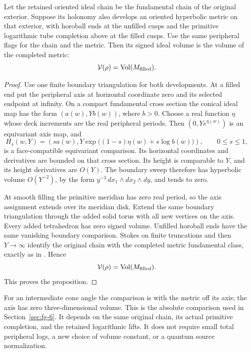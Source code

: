 \begin{proposition}
\label{prop:app-same-chain-volume}
Let the retained oriented ideal chain be the fundamental chain of the
original exterior. Suppose its holonomy also develops an oriented
hyperbolic metric on that exterior, with horoball ends at the unfilled
cusps and the primitive logarithmic tube completion above at the filled
cusps. Use the same peripheral flags for the chain and the metric.
Then its signed ideal volume is the volume of the completed metric:
\[
                  \mathcal V(\rho)=\operatorname{Vol}(M_{\mathrm{filled}}).
\]
\end{proposition}

\begin{proof}
Use one finite boundary triangulation for both developments.
At a filled end put the peripheral axis at horizontal coordinate zero
and its selected endpoint at infinity. On a compact fundamental cross
section the conical ideal map has the form
\((a(w),Yb(w))\), where \(b>0\). Choose a real function \(\eta\)
whose deck increments are the real peripheral periods. Then
\((0,Ye^{\eta(w)})\) is an equivariant axis map, and
\[
 H_s(w,Y)=\left(sa(w),
     Y\exp\bigl((1-s)\eta(w)+s\log b(w)\bigr)\right),
                  \qquad 0\le s\le1,
\]
is a face-compatible equivariant comparison. Its horizontal coordinates
and derivatives are bounded on that cross section. Its height is
comparable to \(Y\), and its height derivatives are \(O(Y)\).
The boundary sweep therefore has hyperbolic volume \(O(Y^{-2})\),
by the form \(y^{-3}\,dx_1\wedge dx_2\wedge dy\), and tends to zero.

At smooth filling the primitive meridian has zero real period, so the
axis assignment extends over its meridian disk. Extend the same boundary
triangulation through the added solid torus with all new vertices on the
axis. Every added tetrahedron has zero signed volume. Unfilled horoball
ends have the same vanishing boundary comparison. Stokes on finite
truncations and then \(Y\to\infty\) identify the original chain with
the completed metric fundamental class, exactly as in
\cite[Section~7.3]{MarkedFillings}. Hence
\[
                  \mathcal V(\rho)=\operatorname{Vol}(M_{\mathrm{filled}}).
\]
This proves the proposition.
\end{proof}

For an intermediate cone angle the comparison is with the metric off
its axis; the axis has zero three-dimensional volume. This is the
absolute comparison used in Section~\ref{sec:fg-6}. It depends on the
same original chain, its actual primitive completion, and the retained
logarithmic lifts. It does not require small total peripheral logs, a
new choice of volume constant, or a quantum source normalization.
